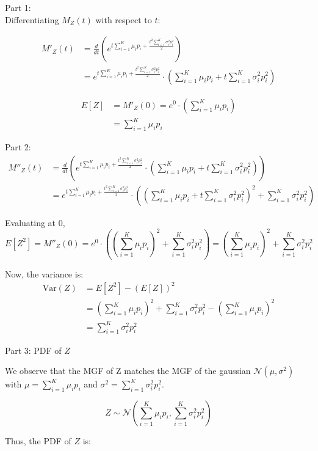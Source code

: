 \documentclass[a4paper,12pt,answers]{exam}
\begin{document}
\begin{questions}
\begin{solution}
Part 1:\\
Differentiating \( M_Z(t) \) with respect to \( t \):

\begin{align*}
M'_Z(t) &= \frac{d}{dt} \left(e^{t \sum_{i=1}^K \mu_i p_i + \frac{t^2 \sum_{i=1}^K \sigma_i^2 p_i^2}{2}}\right)\\
&= e^{t \sum_{i=1}^K \mu_i p_i + \frac{t^2 \sum_{i=1}^K \sigma_i^2 p_i^2}{2}} \cdot \left(\sum_{i=1}^K \mu_i p_i + t \sum_{i=1}^K \sigma_i^2 p_i^2\right)    
\end{align*}

\begin{align*}
E[Z] &= M'_Z(0) = e^0 \cdot \left(\sum_{i=1}^K \mu_i p_i\right) \\
&= \sum_{i=1}^K \mu_i p_i
\end{align*}

Part 2:
\begin{align*}
M''_Z(t) &= \frac{d}{dt} \left( e^{t \sum_{i=1}^K \mu_i p_i + \frac{t^2 \sum_{i=1}^K \sigma_i^2 p_i^2}{2}} \cdot \left(\sum_{i=1}^K \mu_i p_i + t \sum_{i=1}^K \sigma_i^2 p_i^2\right) \right)\\
&= e^{t \sum_{i=1}^K \mu_i p_i + \frac{t^2 \sum_{i=1}^K \sigma_i^2 p_i^2}{2}} \cdot \left( \left(\sum_{i=1}^K \mu_i p_i + t \sum_{i=1}^K \sigma_i^2 p_i^2\right)^2 + \sum_{i=1}^K \sigma_i^2 p_i^2 \right)
\end{align*}

Evaluating at 0,
\[
E[Z^2]= M''_Z(0) = e^0 \cdot \left( \left(\sum_{i=1}^K \mu_i p_i\right)^2 + \sum_{i=1}^K \sigma_i^2 p_i^2 \right) = \left(\sum_{i=1}^K \mu_i p_i\right)^2 + \sum_{i=1}^K \sigma_i^2 p_i^2
\]

Now, the variance is:
\begin{align*}
\text{Var}(Z) &= E[Z^2] - (E[Z])^2\\
&= \left(\sum_{i=1}^K \mu_i p_i\right)^2 + \sum_{i=1}^K \sigma_i^2 p_i^2 - \left(\sum_{i=1}^K \mu_i p_i\right)^2\\
&= \sum_{i=1}^K \sigma_i^2 p_i^2
\end{align*}


Part 3: PDF of \( Z \)

We observe that the MGF of Z matches the MGF of the gaussian $\mathcal{N}(\mu, \sigma^2)$ with $\mu=\sum_{i=1}^K \mu_i p_i$ and $\sigma^2=\sum_{i=1}^K \sigma_i^2 p_i^2$.

\[
Z \sim \mathcal{N}\left(\sum_{i=1}^K \mu_i p_i, \sum_{i=1}^K \sigma_i^2 p_i^2\right)
\]

Thus, the PDF of \( Z \) is:


\end{solution}
\end{questions}
\end{document}
